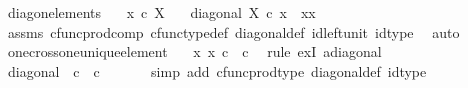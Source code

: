 \begin{isabellebody}
%
\endisatagproof
{\isafoldproof}%
%
\isadelimproof
%
\endisadelimproof
%
\isadelimdocument
%
\endisadelimdocument
%
\isatagdocument
%
\isamarkuptrue%
%
\endisatagdocument
{\isafolddocument}%
%
\isadelimdocument
%
\endisadelimdocument
{}\isamarkupfalse%
\ diag{\isacharunderscore}{\kern0pt}on{\isacharunderscore}{\kern0pt}elements{\isacharcolon}{\kern0pt}\isanewline
\ \ \ {\isachardoublequoteopen}x\ {\isasymin}\isactrlsub c\ X{\isachardoublequoteclose}\isanewline
\ \ \ {\isachardoublequoteopen}diagonal\ X\ {\isasymcirc}\isactrlsub c\ x\ {\isacharequal}{\kern0pt}\ {\isasymlangle}x{\isacharcomma}{\kern0pt}x{\isasymrangle}{\isachardoublequoteclose}\isanewline
%
\isadelimproof
\ \ %
\endisadelimproof
%
\isatagproof
{}\isamarkupfalse%
\ assms\ cfunc{\isacharunderscore}{\kern0pt}prod{\isacharunderscore}{\kern0pt}comp\ cfunc{\isacharunderscore}{\kern0pt}type{\isacharunderscore}{\kern0pt}def\ diagonal{\isacharunderscore}{\kern0pt}def\ id{\isacharunderscore}{\kern0pt}left{\isacharunderscore}{\kern0pt}unit\ id{\isacharunderscore}{\kern0pt}type\ \isamarkupfalse%
\ auto%
\endisatagproof
{\isafoldproof}%
%
\isadelimproof
\isanewline
%
\endisadelimproof
\isanewline
{}\isamarkupfalse%
\ one{\isacharunderscore}{\kern0pt}cross{\isacharunderscore}{\kern0pt}one{\isacharunderscore}{\kern0pt}unique{\isacharunderscore}{\kern0pt}element{\isacharcolon}{\kern0pt}\isanewline
\ \ {\isachardoublequoteopen}{\isasymexists}{\isacharbang}{\kern0pt}\ x{\isachardot}{\kern0pt}\ x\ {\isasymin}\isactrlsub c\ {\isasymone}\ {\isasymtimes}\isactrlsub c\ {\isasymone}{\isachardoublequoteclose}\isanewline
%
\isadelimproof
%
\endisadelimproof
%
\isatagproof
{}\isamarkupfalse%
\ {\isacharparenleft}{\kern0pt}rule\ ex{}I{\isacharbrackleft}{\kern0pt}\ a{\isacharequal}{\kern0pt}{\isachardoublequoteopen}diagonal\ {\isasymone}{\isachardoublequoteclose}{\isacharbrackright}{\kern0pt}{\isacharparenright}{\kern0pt}\isanewline
\ \ \isamarkupfalse%
\ {\isachardoublequoteopen}diagonal\ {\isasymone}\ {\isasymin}\isactrlsub c\ {\isasymone}\ {\isasymtimes}\isactrlsub c\ {\isasymone}{\isachardoublequoteclose}\isanewline
\ \ \ \ \isamarkupfalse%
\ {\isacharparenleft}{\kern0pt}simp\ add{\isacharcolon}{\kern0pt}\ cfunc{\isacharunderscore}{\kern0pt}prod{\isacharunderscore}{\kern0pt}type\ diagonal{\isacharunderscore}{\kern0pt}def\ id{\isacharunderscore}{\kern0pt}type{\isacharparenright}{\kern0pt}\isanewline

\end{isabellebody}
